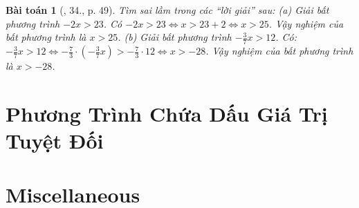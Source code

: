 \documentclass{article}
\newtheorem{baitoan}{Bài toán}
\begin{document}
\begin{baitoan}[\cite{SGK_Toan_8_tap_2}, 34., p. 49]
	Tìm sai lầm trong các ``lời giải'' sau: (a) Giải bất phương trình $-2x > 23$. Có $-2x > 23\Leftrightarrow x > 23 + 2\Leftrightarrow x > 25$. Vậy nghiệm của bất phương trình là $x > 25$. (b) Giải bất phương trình $-\frac{3}{7}x > 12$. Có: $-\frac{3}{7}x > 12\Leftrightarrow-\frac{7}{3}\cdot\left(-\frac{3}{7}x\right) > -\frac{7}{3}\cdot12\Leftrightarrow x > -28$. Vậy nghiệm của bất phương trình là $x > -28$.
\end{baitoan}


\section{Phương Trình Chứa Dấu Giá Trị Tuyệt Đối}


\section{Miscellaneous}


\printbibliography[heading=bibintoc]
	
\end{document}
